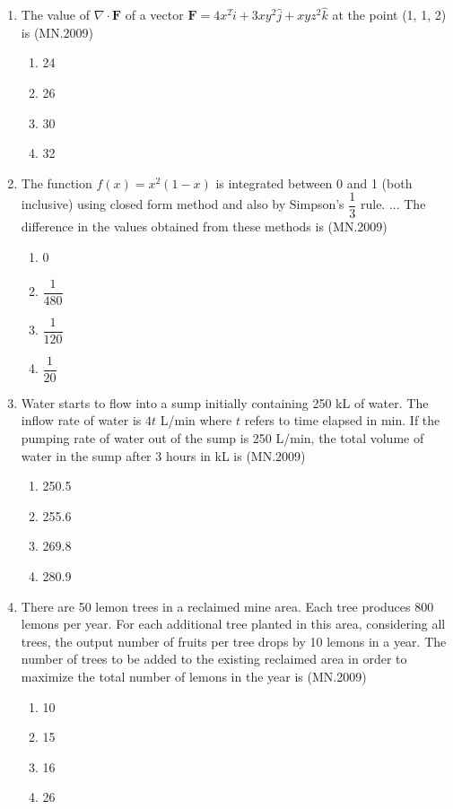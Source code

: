 \documentclass[journal]{IEEEtran}
\numberwithin{equation}{enumi}
\numberwithin{figure}{enumi}
\begin{document}
\begin{enumerate}
    \item The value of $\nabla \cdot \mathbf{F}$ of a vector $\mathbf{F} = 4x^2 \hat{i} + 3xy^2 \hat{j} + xyz^2 \hat{k}$ at the point (1, 1, 2) is
    \hfill{(MN.2009)}
    \begin{enumerate}[label=(\Alph*)]
        \item 24
        \item 26
        \item 30
        \item 32
    \end{enumerate}

  \item The function $f(x) = x^2(1 - x)$ is integrated between 0 and 1 (both inclusive) using closed form method and also by Simpson's $\dfrac{1}{3}$ rule. ...
     The difference in the values obtained from these methods is
  \hfill{(MN.2009)}
    \begin{enumerate}[label=(\Alph*)]
        \item 0
        \item $\dfrac{1}{480}$
        \item $\dfrac{1}{120}$
        \item $\dfrac{1}{20}$
    \end{enumerate}

    \item Water starts to flow into a sump initially containing 250 kL of water. The inflow rate of water is $4t$ L/min where $t$ refers to time elapsed in min. If the pumping rate of water out of the sump is 250 L/min, the total volume of water in the sump after 3 hours in kL is
    \hfill{(MN.2009)}
    \begin{enumerate}[label=(\Alph*)]
        \item 250.5
        \item 255.6
        \item 269.8
        \item 280.9
    \end{enumerate}

    \item There are 50 lemon trees in a reclaimed mine area. Each tree produces 800 lemons per year. For each additional tree planted in this area, considering all trees, the output number of fruits per tree drops by 10 lemons in a year. The number of trees to be added to the existing reclaimed area in order to maximize the total number of lemons in the year is
    \hfill{(MN.2009)}
    \begin{enumerate}[label=(\Alph*)]
        \item 10
        \item 15
        \item 16
        \item 26
    \end{enumerate}


\end{enumerate}
\end{document}

